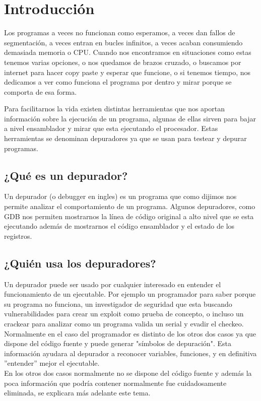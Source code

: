 \section{Introducción}
Los programas a veces no funcionan como esperamos, a veces dan fallos de segmentación, a veces entran en bucles infinitos, a veces acaban consumiendo demasiada memoria o CPU. Cuando nos encontramos en situaciones como estas tenemos varias opciones, o nos quedamos de brazos cruzado, o buscamos por internet para hacer copy paste y esperar que funcione, o si tenemos tiempo, nos dedicamos a ver como funciona el programa por dentro y mirar porque se comporta de esa forma. 

Para facilitarnos la vida existen distintas herramientas que nos aportan información sobre la ejecución de un programa, algunas de ellas sirven para bajar a nivel ensamblador y mirar que esta ejecutando el procesador. Estas herramientas se denominan depuradores ya que se usan para testear y depurar programas.

\subsection{¿Qué es un depurador?}
Un depurador (o debugger en ingles) es un programa que como dijimos nos permite analizar el comportamiento de un programa. Algunos depuradores, como GDB nos permiten mostrarnos la línea  de código original a alto nivel que se esta ejecutando además de mostrarnos el código ensamblador y el estado de los registros.

\subsection{¿Quién usa los depuradores?}
Un depurador puede ser usado por cualquier interesado en entender el funcionamiento de un ejecutable. Por ejemplo un programador para saber porque su programa no funciona, un investigador de seguridad que esta buscando vulnerabilidades para crear un exploit como prueba de concepto, o incluso un crackear para analizar como un programa valida un serial y evadir el checkeo. \\ 

Normalmente en el caso del programador es distinto de los otros dos casos ya que dispone del código fuente y puede generar "símbolos de depuración". Esta información ayudara al depurador a reconocer variables, funciones, y en definitiva ''entender'' mejor el ejecutable.\\ En los otros dos casos normalmente no se dispone del código fuente y además la poca información que podría contener normalmente fue cuidadosamente eliminada, se explicara más adelante este tema.

